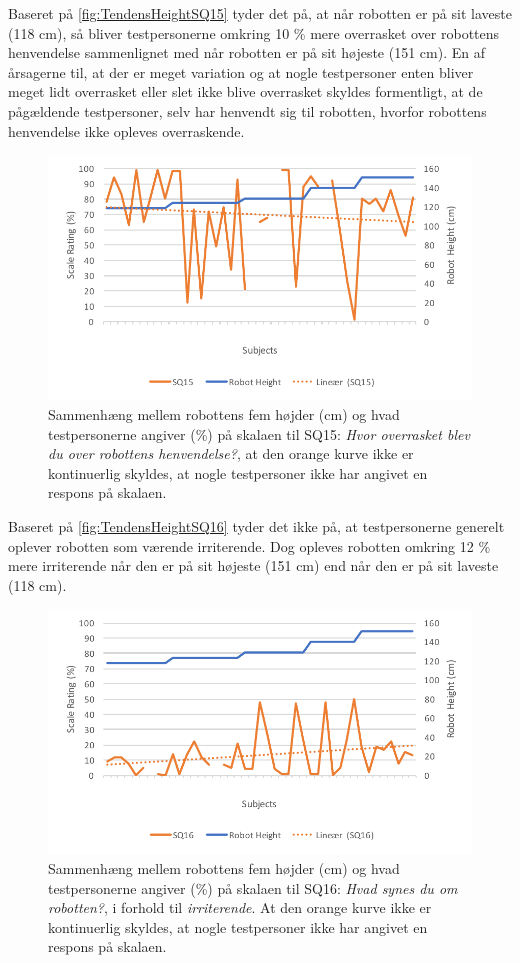 \noindent
%
Baseret på \autoref{fig:TendensHeightSQ15} tyder det på, at når robotten er på sit laveste (118 cm), så bliver testpersonerne omkring 10 \% mere overrasket over robottens henvendelse sammenlignet med når robotten er på sit højeste (151 cm). En af årsagerne til, at der er meget variation og at nogle testpersoner enten bliver meget lidt overrasket eller slet ikke blive overrasket skyldes formentligt, at de pågældende testpersoner, selv har henvendt sig til robotten, hvorfor robottens henvendelse ikke opleves overraskende. 
%
\begin{figure}[H]
\centering
\includegraphics[width=\textwidth]{Figure/DatabehandlingSkalaer/TendensHeight/HeightSQ15}
\caption{Sammenhæng mellem robottens fem højder (cm) og hvad testpersonerne angiver (\%) på skalaen til SQ15: \textit{Hvor overrasket blev du over robottens henvendelse?}, at den orange kurve ikke er kontinuerlig skyldes, at nogle testpersoner ikke har angivet en respons på skalaen.}
\label{fig:TendensHeightSQ15}
\end{figure}
\noindent
%
Baseret på \autoref{fig:TendensHeightSQ16} tyder det ikke på, at testpersonerne generelt oplever robotten som værende irriterende. Dog opleves robotten omkring 12 \% mere irriterende når den er på sit højeste (151 cm) end når den er på sit laveste (118 cm). 
%
\begin{figure}[H]
\centering
\includegraphics[width=\textwidth]{Figure/DatabehandlingSkalaer/TendensHeight/HeightSQ16}
\caption{Sammenhæng mellem robottens fem højder (cm) og hvad testpersonerne angiver (\%) på skalaen til SQ16: \textit{Hvad synes du om robotten?}, i forhold til \textit{irriterende}. At den orange kurve ikke er kontinuerlig skyldes, at nogle testpersoner ikke har angivet en respons på skalaen.}
\label{fig:TendensHeightSQ16}
\end{figure}
